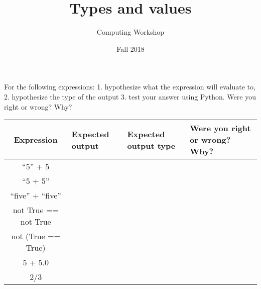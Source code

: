 \documentclass[11pt]{article}
\author{Computing Workshop}
\title{Types and values}
\date{Fall 2018}
\begin{document}
\maketitle

For the following expressions:
1. hypothesize what the expression will evaluate to,
2. hypothesize the type of the output
3. test your answer using Python. Were you right or wrong? Why?
\begin{center}
\renewcommand{\arraystretch}{3.5}
\begin{tabular}{| c | p{5em}| p{5em} | p{21em} |}
    \hline %
    \textbf{Expression} & \textbf{Expected output}
    & \textbf{Expected output type} & \textbf{Were you right or wrong? Why?} \\ \hline
    ``5'' + 5 & ~ & ~ & ~ \\ \hline
    ``5 + 5'' & ~ & ~ & ~ \\ \hline
    ``five'' + ``five'' & ~ & ~ & ~ \\ \hline
    not True == not True & ~ & ~ & ~ \\ \hline
    not (True == True) & ~ & ~ & ~ \\ \hline
    5 + 5.0 & ~ & ~ & ~ \\ \hline
    2/3 & ~ & ~ & ~ \\ \hline
\end{tabular}
\end{center}
\end{document}
